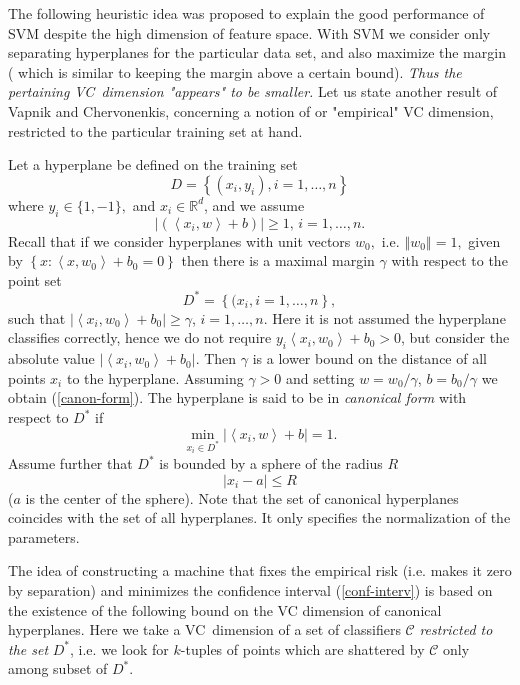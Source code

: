 \documentclass[11pt,twoside]{article}%
\theoremstyle{change}
\begin{document}
\begin{mycomments}
The following heuristic idea was proposed to explain the good performance of
SVM despite the high dimension of feature space. With SVM we consider only
separating hyperplanes for the particular data set, and also maximize the
margin ( which is similar to keeping the margin above a certain bound).
\textit{Thus the pertaining VC\ dimension "appears" to be smaller.} Let us
state another result of Vapnik and Chervonenkis, concerning a notion of or
"empirical" VC dimension, restricted to the particular training set at hand.

Let a hyperplane be defined on the training set
\[
D=\left\{  (x_{i},y_{i}),i=1,\ldots,n\right\}
\]
where $y_{i}\in\{1,-1\},$ and $x_{i}\in\mathbb{R}^{d}$, and we assume
\begin{equation}
\left\vert \left(  \left\langle x_{i},w\right\rangle +b\right)  \right\vert
\geq1\text{, }i=1,\ldots,n.\label{canon-form}%
\end{equation}
Recall that if we consider hyperplanes with unit vectors $w_{0},$ i.e.
$\left\Vert w_{0}\right\Vert =1,$ given by $\left\{  x:\left\langle
x,w_{0}\right\rangle +b_{0}=0\right\}  $ then there is a maximal margin
$\gamma$ with respect to the point set
\[
D^{\ast}=\left\{  (x_{i},i=1,\ldots,n\right\}  ,
\]
such that $\left\vert \left\langle x_{i},w_{0}\right\rangle +b_{0}\right\vert
\geq\gamma$, $i=1,\ldots,n.$ Here it is not assumed the hyperplane classifies
correctly, hence we do not require $y_{i}\left\langle x_{i},w_{0}\right\rangle
+b_{0}>0$, but consider the absolute value $\left\vert \left\langle
x_{i},w_{0}\right\rangle +b_{0}\right\vert .$ Then $\gamma$ is a lower bound
on the distance of all points $x_{i}$ to the hyperplane. Assuming $\gamma>0$
and setting $w=w_{0}/\gamma$, $b=b_{0}/\gamma$ we obtain (\ref{canon-form}).
The hyperplane is said to be in \textit{canonical form} with respect to
$D^{\ast}$ if
\[
\min_{x_{i}\in D^{\ast}}\left\vert \left\langle x_{i},w\right\rangle
+b\right\vert =1.
\]
Assume further that $D^{\ast}$ is bounded by a sphere of the radius $R$
\[
\left\vert x_{i}-a\right\vert \leq R
\]
($a$ is the center of the sphere). Note that the set of canonical hyperplanes
coincides with the set of all hyperplanes. It only specifies the normalization
of the parameters.

The idea of constructing a machine that fixes the empirical risk (i.e. makes
it zero by separation) and minimizes the confidence interval
(\ref{conf-interv}) is based on the existence of the following bound on the VC
dimension of canonical hyperplanes. Here we take a VC\ dimension of a set of
classifiers $\mathcal{C}$ \textit{restricted to the set }$D^{\ast}$, i.e. we
look for $k$-tuples of points which are shattered by $\mathcal{C}$ only among
subset of $D^{\ast}$.


\end{mycomments}
\end{document}
